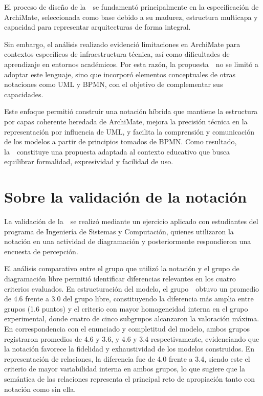 El proceso de diseño de la~\NDITI~se fundamentó principalmente en la especificación de ArchiMate, seleccionada como base debido a su madurez, estructura multicapa y capacidad para representar arquitecturas de forma integral.

Sin embargo, el análisis realizado evidenció limitaciones en ArchiMate para contextos específicos de infraestructura técnica, así como dificultades de aprendizaje en entornos académicos. Por esta razón, la propuesta~\NDITI~no se limitó a adoptar este lenguaje, sino que incorporó elementos conceptuales de otras notaciones como UML y BPMN, con el objetivo de complementar sus capacidades.

Este enfoque permitió construir una notación híbrida que mantiene la estructura por capas coherente heredada de ArchiMate, mejora la precisión técnica en la representación por influencia de UML, y facilita la comprensión y comunicación de los modelos a partir de principios tomados de BPMN. Como resultado, la~\NDITI~constituye una propuesta adaptada al contexto educativo que busca equilibrar formalidad, expresividad y facilidad de uso.


\section{Sobre la validación de la notación}
\noindent
La validación de la~\NDITI~se realizó mediante un ejercicio aplicado con estudiantes del programa de Ingeniería de Sistemas y Computación, quienes utilizaron la notación en una actividad de diagramación y posteriormente respondieron una encuesta de percepción.

El análisis comparativo entre el grupo que utilizó la notación y el grupo de diagramación libre permitió identificar diferencias relevantes en los cuatro criterios evaluados. En estructuración del modelo, el grupo~\NDITI~obtuvo un promedio de 4.6 frente a 3.0 del grupo libre, constituyendo la diferencia más amplia entre grupos (1.6 puntos) y el criterio con mayor homogeneidad interna en el grupo experimental, donde cuatro de cinco subgrupos alcanzaron la valoración máxima. En correspondencia con el enunciado y completitud del modelo, ambos grupos registraron promedios de 4.6 y 3.6, y 4.6 y 3.4 respectivamente, evidenciando que la notación favorece la fidelidad y exhaustividad de los modelos construidos. En representación de relaciones, la diferencia fue de 4.0 frente a 3.4, siendo este el criterio de mayor variabilidad interna en ambos grupos, lo que sugiere que la semántica de las relaciones representa el principal reto de apropiación tanto con notación como sin ella.

